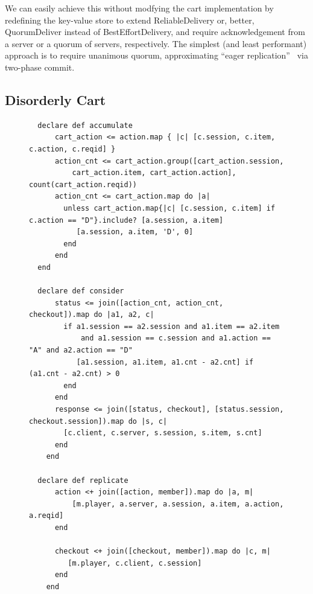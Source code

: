 We can easily achieve this without modfying the cart implementation
by redefining the key-value store to extend
ReliableDelivery or, better, QuorumDeliver instead of BestEffortDelivery, and require acknowledgement from a server or a quorum of servers, respectively.
The simplest (and least performant) approach is to require unanimous quorum,
approximating ``eager replication''~\cite{dangers} via two-phase commit.


\subsection{Disorderly Cart}

\begin{figure}[t]
\begin{tiny}
\begin{verbatim}
  declare def accumulate 
      cart_action <= action.map { |c| [c.session, c.item, c.action, c.reqid] }
      action_cnt <= cart_action.group([cart_action.session, 
          cart_action.item, cart_action.action], count(cart_action.reqid))
      action_cnt <= cart_action.map do |a| 
        unless cart_action.map{|c| [c.session, c.item] if c.action == "D"}.include? [a.session, a.item] 
           [a.session, a.item, 'D', 0]
        end 
      end
  end

  declare def consider
      status <= join([action_cnt, action_cnt, checkout]).map do |a1, a2, c| 
        if a1.session == a2.session and a1.item == a2.item 
            and a1.session == c.session and a1.action == "A" and a2.action == "D"
           [a1.session, a1.item, a1.cnt - a2.cnt] if (a1.cnt - a2.cnt) > 0
        end
      end
      response <= join([status, checkout], [status.session, checkout.session]).map do |s, c| 
        [c.client, c.server, s.session, s.item, s.cnt]
      end
    end

  declare def replicate
      action <+ join([action, member]).map do |a, m|
          [m.player, a.server, a.session, a.item, a.action, a.reqid]
      end

      checkout <+ join([checkout, member]).map do |c, m|
         [m.player, c.client, c.session]
      end
    end


\end{verbatim}
\end{tiny}


\end{figure}

